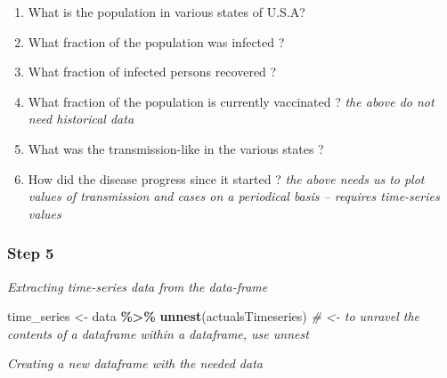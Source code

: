 \documentclass[
]{article}
\newenvironment{Shaded}{\begin{snugshade}}{\end{snugshade}}
\newcommand{\CommentTok}[1]{\textcolor[rgb]{0.56,0.35,0.01}{\textit{#1}}}
\newcommand{\FunctionTok}[1]{\textcolor[rgb]{0.13,0.29,0.53}{\textbf{#1}}}
\newcommand{\NormalTok}[1]{#1}
\newcommand{\OtherTok}[1]{\textcolor[rgb]{0.56,0.35,0.01}{#1}}
\newcommand{\SpecialCharTok}[1]{\textcolor[rgb]{0.81,0.36,0.00}{\textbf{#1}}}
\begin{document}
\begin{enumerate}
\def\labelenumi{\roman{enumi}.}
\item
  What is the population in various states of U.S.A?
\item
  What fraction of the population was infected ?
\item
  What fraction of infected persons recovered ?
\item
  What fraction of the population is currently vaccinated ? \emph{the
  above do not need historical data}
\item
  What was the transmission-like in the various states ?
\item
  How did the disease progress since it started ? \emph{the above needs
  us to plot values of transmission and cases on a periodical basis --
  requires time-series values}
\end{enumerate}

\hypertarget{step-5}{%
\subsubsection{Step 5}\label{step-5}}

\emph{Extracting time-series data from the data-frame}

\begin{Shaded}
\begin{Highlighting}[]
\NormalTok{time\_series }\OtherTok{\textless{}{-}}\NormalTok{ data }\SpecialCharTok{\%\textgreater{}\%} \FunctionTok{unnest}\NormalTok{(actualsTimeseries) }
\CommentTok{\# \textless{}{-} to unravel the contents of a dataframe within a dataframe, use unnest}
\end{Highlighting}
\end{Shaded}

\emph{Creating a new dataframe with the needed data}
\end{document}
